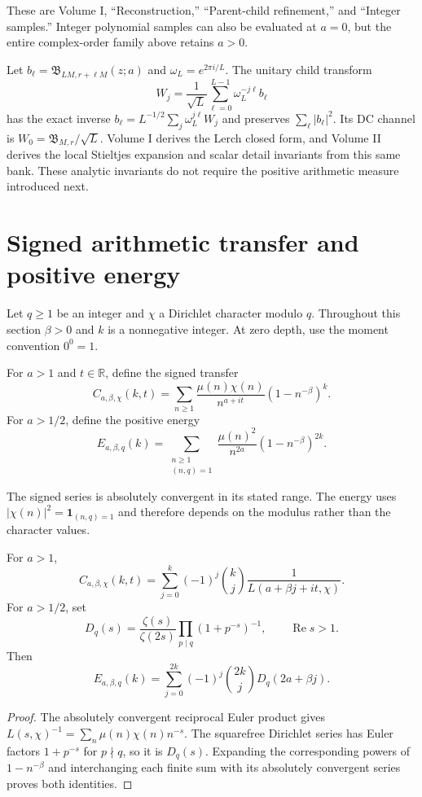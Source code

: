 These are Volume I, ``Reconstruction,'' ``Parent-child refinement,'' and ``Integer samples.'' Integer polynomial samples can also be evaluated at $a=0$, but the entire complex-order family above retains $a>0$.

Let $b_\ell=\mathfrak B_{LM,r+\ell M}(z;a)$ and $\omega_L=e^{2\pi i/L}$. The unitary child transform
\[
W_j=\frac1{\sqrt L}\sum_{\ell=0}^{L-1}
\omega_L^{-j\ell}b_\ell
\]
has the exact inverse $b_\ell=L^{-1/2}\sum_j\omega_L^{j\ell}W_j$ and preserves $\sum_\ell|b_\ell|^2$. Its DC channel is $W_0=\mathfrak B_{M,r}/\sqrt L$. Volume I derives the Lerch closed form, and Volume II derives the local Stieltjes expansion and scalar detail invariants from this same bank. These analytic invariants do not require the positive arithmetic measure introduced next.

\section{Signed arithmetic transfer and positive energy}

Let $q\ge1$ be an integer and $\chi$ a Dirichlet character modulo $q$. Throughout this section $\beta>0$ and $k$ is a nonnegative integer. At zero depth, use the moment convention $0^0=1$.

\begin{definition}
For $a>1$ and $t\in\mathbb R$, define the signed transfer
\[
C_{a,\beta,\chi}(k,t)=
\sum_{n\ge1}\frac{\mu(n)\chi(n)}{n^{a+it}}
(1-n^{-\beta})^k.
\]
For $a>1/2$, define the positive energy
\[
E_{a,\beta,q}(k)=
\sum_{\substack{n\ge1\\(n,q)=1}}
\frac{\mu(n)^2}{n^{2a}}(1-n^{-\beta})^{2k}.
\]
\end{definition}

The signed series is absolutely convergent in its stated range. The energy uses $|\chi(n)|^2=\boldsymbol 1_{(n,q)=1}$ and therefore depends on the modulus rather than the character values.

\begin{proposition}
For $a>1$,
\[
C_{a,\beta,\chi}(k,t)=
\sum_{j=0}^{k}(-1)^j\binom{k}{j}
\frac1{L(a+\beta j+it,\chi)}.
\]
For $a>1/2$, set
\[
D_q(s)=\frac{\zeta(s)}{\zeta(2s)}
\prod_{p\mid q}(1+p^{-s})^{-1},\qquad \operatorname{Re}s>1.
\]
Then
\[
E_{a,\beta,q}(k)=
\sum_{j=0}^{2k}(-1)^j\binom{2k}{j}D_q(2a+\beta j).
\]
\end{proposition}
\begin{proof}
The absolutely convergent reciprocal Euler product gives
$L(s,\chi)^{-1}=\sum_n\mu(n)\chi(n)n^{-s}$.
The squarefree Dirichlet series has Euler factors $1+p^{-s}$ for $p\nmid q$, so it is $D_q(s)$. Expanding the corresponding powers of $1-n^{-\beta}$ and interchanging each finite sum with its absolutely convergent series proves both identities.
\end{proof}

